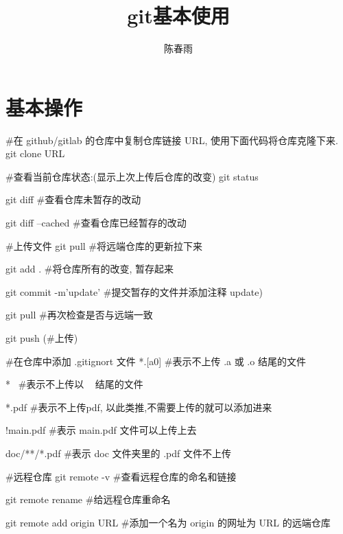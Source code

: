 \documentclass{article}
\begin{document}
\title{git基本使用}
\author{陈春雨}
\maketitle
\section{基本操作}
\begin{listing}[H]
    \begin{pythoncode}
    #在 github/gitlab 的仓库中复制仓库链接 URL, 使用下面代码将仓库克隆下来.
    git clone URL



    #查看当前仓库状态:(显示上次上传后仓库的改变)
    git status
    
    git diff                 #查看仓库未暂存的改动
    
    git diff --cached        #查看仓库已经暂存的改动



    #上传文件
    git pull                 #将远端仓库的更新拉下来

    git add .                #将仓库所有的改变, 暂存起来

    git commit -m'update'    #提交暂存的文件并添加注释 update)

    git pull                 #再次检查是否与远端一致

    git push (#上传)



    #在仓库中添加 .gitignort 文件
    *.[a0]                   #表示不上传 .a 或 .o 结尾的文件

    *~                       #表示不上传以 ~ 结尾的文件

    *.pdf                    #表示不上传pdf, 以此类推,不需要上传的就可以添加进来

    !main.pdf                #表示 main.pdf 文件可以上传上去

    doc/**/*.pdf             #表示 doc 文件夹里的 .pdf 文件不上传
    
    
    
    #远程仓库
    git remote -v            #查看远程仓库的命名和链接
    
    git remote rename        #给远程仓库重命名
    
    git remote add origin URL       #添加一个名为 origin 的网址为 URL 的远端仓库
    \end{pythoncode}
\end{listing}


\cite{fem_2010}


\end{document}
